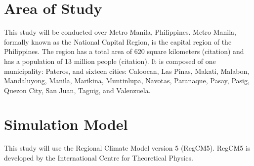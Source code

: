 \section{Area of Study}
	This study will be conducted over Metro Manila, Philippines.
	Metro Manila, formally known as the National Capital Region, is the capital region of the Philippines.
	The region has a total area of 620 square kilometers (citation)
		and has a population of 13 million people (citation).
	It is composed of one municipality: Pateros, and sixteen cities:
		Caloocan,
		Las Pinas,
		Makati,
		Malabon,
		Mandaluyong,
		Manila,
		Marikina,
		Muntinlupa,
		Navotas,
		Paranaque,
		Pasay,
		Pasig,
		Quezon City,
		San Juan,
		Taguig, and
		Valenzuela.
		
\section{Simulation Model}
	This study will use the Regional Climate Model version 5 (RegCM5).
	RegCM5 is developed by the International Centre for Theoretical Physics.